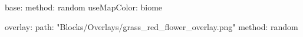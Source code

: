 base:
  method: random
  useMapColor: biome
  
overlay:
  path: "Blocks/Overlays/grass_red_flower_overlay.png"
  method: random